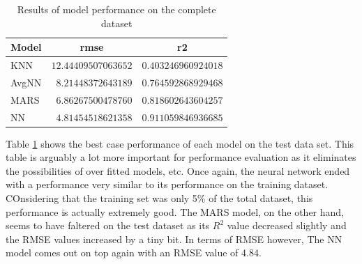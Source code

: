 \documentclass[letterpaper,12pt,titlepage,oneside,final]{report}
\begin{document}
            \begin{table}[!hp]
                \begin{center}
                \begin{tabular}{lrr}
                \hline\hline
                \multicolumn{1}{l}{Model}&\multicolumn{1}{c}{rmse}&\multicolumn{1}{c}{r2}\tabularnewline
                \hline
                KNN&$12.44409507063652$&$0.403246960924018$\tabularnewline
                AvgNN&$ 8.21448372643189$&$0.764592868929468$\tabularnewline
                MARS&$ 6.86267500478760$&$0.818602643604257$\tabularnewline
                NN&$ 4.81454518621358$&$0.911059846936685$\tabularnewline
                \hline
                \end{tabular}
                \caption{Results of model performance on the complete dataset}
                \label{test-res}
                \end{center}
            \end{table}
            Table \ref{test-res} shows the best case performance of each model on the test data set. This table is arguably a lot more important for performance evaluation as it eliminates the possibilities of over fitted models, etc. Once again, the neural network ended with a performance very similar to its performance on the training dataset. COnsidering that the training set was only 5\% of the total dataset, this performance is actually extremely good. The MARS model, on the other hand, seems to have faltered on the test dataset as its $R^2$ value decreased slightly and the RMSE values increased by a tiny bit. In terms of RMSE however, The NN model comes out on top again with an RMSE value of 4.84. 
\end{document}
